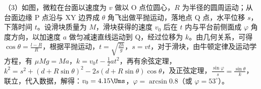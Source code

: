 \documentclass[\gkver]{gaokaozhenti}
\begin{document}
\begin{enumerate}
{（3）如图，微粒在台面以速度为 $v$ 做以 O 点位圆心，$R$ 为半径的圆周运动；从台面边缘 P 点沿与 XY 边界成 $\theta$ 角飞出做平抛运动，落地点 Q 点，水平位移 $s$，下落时间 $t$。设滑块质量为 $M$，滑块获得的速度 $v_{0}$ 后在 $t$ 内与平台前侧面成 $\varphi$ 角度方向，以加速度 $a$ 做匀减速直线运动到 Q，经过位移为 $k$。由几何关系，可得 $\cos\theta=\frac{l-R}{R}$，根据平抛运动，$t=\sqrt{\frac{2h}{g}}$，$s=vt$，对于滑块，由牛顿定律及运动学方程，有 $\mu Mg=Ma$，$k=v_{0}t-\frac{1}{2}at^{2}$，再有余弦定理，$k^{2}=s^{2}+(d+R\sin\theta)^{2}-2s(d+R\sin\theta)\cos\theta$，及正弦定理，$\frac{\sin\varphi}{s}=\frac{\sin\theta}{k}$，联立，代入数据，解得：$v_{0}=4.15\Ums$，$\varphi=\arcsin0.8$（或 $\varphi=53^{\circ}$）。

}

\end{enumerate}
\end{document}
